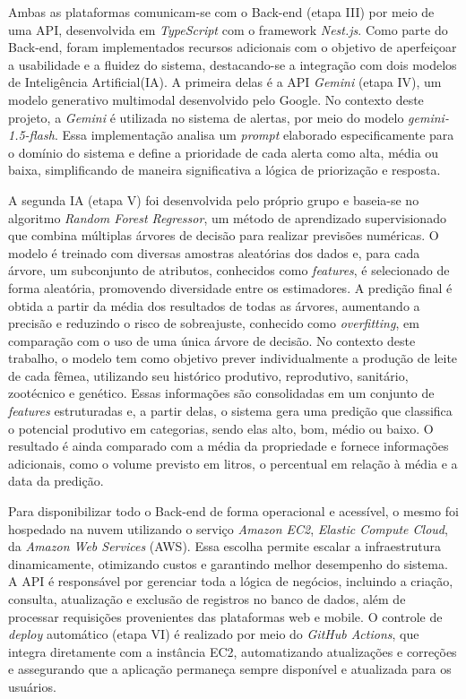 Ambas as plataformas comunicam-se com o Back-end (etapa III) por meio de uma API, desenvolvida em \textit{TypeScript} com o framework \textit{Nest.js}. Como parte do Back-end, foram implementados recursos adicionais com o objetivo de aperfeiçoar a usabilidade e a fluidez do sistema, destacando-se a integração com dois modelos de Inteligência Artificial(IA). A primeira delas é a API \textit{Gemini} (etapa IV), um modelo generativo multimodal desenvolvido pelo Google. No contexto deste projeto, a \textit{Gemini} é utilizada no sistema de alertas, por meio do modelo \textit{gemini-1.5-flash}. Essa implementação analisa um \textit{prompt} elaborado especificamente para o domínio do sistema e define a prioridade de cada alerta como alta, média ou baixa, simplificando de maneira significativa a lógica de priorização e resposta.

A segunda IA (etapa V) foi desenvolvida pelo próprio grupo e baseia-se no algoritmo \textit{Random Forest Regressor}, um método de aprendizado supervisionado que combina múltiplas árvores de decisão para realizar previsões numéricas. O modelo é treinado com diversas amostras aleatórias dos dados e, para cada árvore, um subconjunto de atributos, conhecidos como \textit{features}, é selecionado de forma aleatória, promovendo diversidade entre os estimadores. A predição final é obtida a partir da média dos resultados de todas as árvores, aumentando a precisão e reduzindo o risco de sobreajuste, conhecido como \textit{overfitting}, em comparação com o uso de uma única árvore de decisão. No contexto deste trabalho, o modelo tem como objetivo prever individualmente a produção de leite de cada fêmea, utilizando seu histórico produtivo, reprodutivo, sanitário, zootécnico e genético. Essas informações são consolidadas em um conjunto de \textit{features} estruturadas e, a partir delas, o sistema gera uma predição que classifica o potencial produtivo em categorias, sendo elas alto, bom, médio ou baixo. O resultado é ainda comparado com a média da propriedade e fornece informações adicionais, como o volume previsto em litros, o percentual em relação à média e a data da predição.

Para disponibilizar todo o Back-end de forma operacional e acessível, o mesmo foi hospedado na nuvem utilizando o serviço \textit{Amazon EC2}, \textit{Elastic Compute Cloud}, da \textit{Amazon Web Services} (AWS). Essa escolha permite escalar a infraestrutura dinamicamente, otimizando custos e garantindo melhor desempenho do sistema. A API é responsável por gerenciar toda a lógica de negócios, incluindo a criação, consulta, atualização e exclusão de registros no banco de dados, além de processar requisições provenientes das plataformas web e mobile. O controle de \textit{deploy} automático (etapa VI) é realizado por meio do \textit{GitHub Actions}, que integra diretamente com a instância EC2, automatizando atualizações e correções e assegurando que a aplicação permaneça sempre disponível e atualizada para os usuários.


